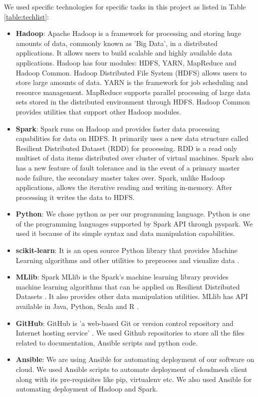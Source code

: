 \documentclass[9pt,twocolumn,twoside]{../../styles/osajnl}
\begin{document}
We used specific technologies for specific tasks in this project as listed in Table \ref{table:techlist}:
\begin{itemize}
 \item \textbf{Hadoop}: Apache Hadoop is a framework for processing and storing huge amounts of data, commonly known as 'Big Data', in a distributed applications. It allows users to build scalable and highly available data applications. Hadoop has four modules: HDFS, YARN, MapReduce and Hadoop Common. Hadoop Distributed File System (HDFS) allows users to store large amounts of data.  YARN is the framework for job scheduling and resource management. MapReduce supports parallel processing of large data sets stored in the distributed environment through HDFS. Hadoop Common provides utilities that support other Hadoop modules.
 
 \item \textbf{Spark}: Spark runs on Hadoop and provides faster data processing capabilities for data on HDFS. It primarily uses a new data structure called Resilient Distributed Dataset (RDD) for processing. RDD is a read only multiset of data items distributed over cluster of virtual machines. Spark also has a new feature of fault tolerance and in the event of a primary master node failure, the secondary master takes over. Spark, unlike Hadoop applications, allows the iterative reading and writing in-memory. After processing it writes the data to HDFS.
 
 \item \textbf{Python}: We chose python as per our programming language. Python is one of the programming languages supported by Spark API through pyspark. We used it because of its simple syntax and data manipulation capabilities.
 \item \textbf{scikit-learn}: It is an open source Python library that provides Machine Learning algorithms and other utilities to preprocess and visualize data \cite{www-sklearn}.
 
 \item \textbf{MLlib}: Spark MLlib is the Spark’s machine learning library provides machine learning algorithms that can be applied on Resilient Distributed Datasets \cite{www-mllibguide}. It also provides other data manipulation utilities. MLlib has API available in Java, Python, Scala and R \cite{www-mllib}.
 
 
 
 \item \textbf{GitHub}: GitHub is 'a web-based Git or version control repository and Internet hosting service' \cite{www-wikigit}. We used Github repositories to store all the files related to documentation, Ansible scripts and python code.
 \item \textbf{Ansible}: We are using Ansible for automating deployment of our software on cloud. We used Ansible scripts to automate deployment of cloudmesh client along with its pre-requisites like pip, virtualenv etc. We also used Ansible for automating deployment of Hadoop and Spark.
\end{itemize}
\end{document}
